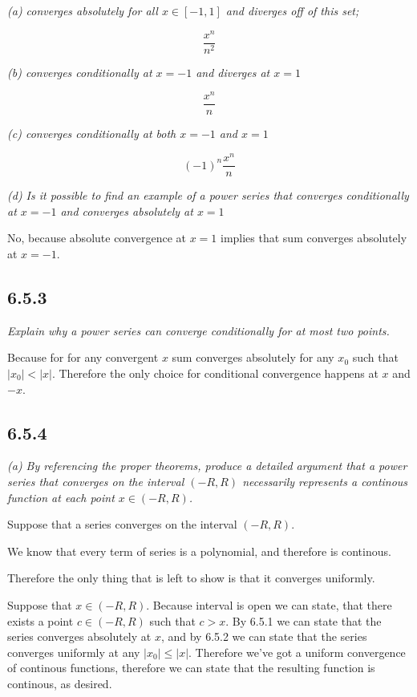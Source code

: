 \documentclass[11pt,oneside,titlepage]{book}
\begin{document}
\textit{(a) converges absolutely for all $x \in [-1, 1]$ and diverges off
  of this set;}

$$\frac{x^n}{n^2}$$

\textit{(b) converges conditionally at $x = -1$ and diverges at $x = 1$}

$$\frac{x^n}{n}$$

\textit{(c) converges conditionally at both $x = -1$ and $x = 1$}

$$(-1)^n\frac{x^n}{n}$$

\textit{(d) Is it possible to find an example of a power series that converges
  conditionally at $x = -1$ and converges absolutely at $x = 1$}

No, because absolute convergence at $x = 1$ implies that sum converges
absolutely at $x = -1$.

\subsection*{6.5.3}
\textit{Explain why a power series can converge conditionally for at most
  two points.}

Because for for any convergent  $x$ sum converges absolutely
for any $x_0$ such that $|x_0| < |x|$. Therefore the only choice
for conditional convergence happens at $x$ and $-x$.

\subsection*{6.5.4}
\textit{(a) By referencing the proper theorems, produce a detailed argument
  that a power series that converges on the interval $(-R, R)$ necessarily
  represents  a continous function at each point $x \in (-R, R)$.}

Suppose that a series converges on the interval $(-R, R)$.

We know that every term of series is a polynomial, and therefore is continous.

Therefore the only thing that is left to show is that it converges uniformly.

Suppose that $x \in (-R, R)$. Because interval is open we can state, that
there exists a point $c \in (-R, R)$ such that $c > x$. By 6.5.1 we can state
that the series converges absolutely at $x$, and by 6.5.2 we can state that
the series converges uniformly at any $|x_0| \leq |x|$. Therefore
we've got a uniform convergence of continous functions, therefore we
can state that the resulting function is continous, as desired.
\end{document}
